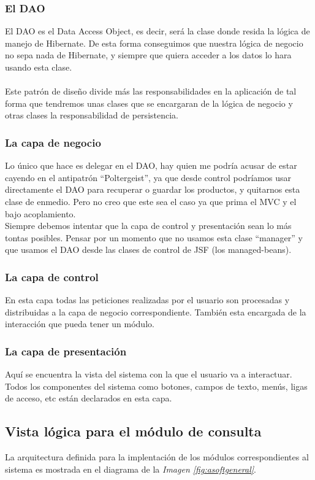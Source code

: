 \documentclass[../reportesINE.tex]{subfiles}
\begin{document}
\subsubsection{El DAO}
El DAO es el Data Access Object, es decir, será la clase donde resida la lógica de manejo de Hibernate. De esta forma conseguimos que nuestra lógica de negocio no sepa nada de Hibernate, y siempre que quiera acceder a los datos lo hara usando esta clase. \\ \\
Este patrón de diseño divide más las responsabilidades en la aplicación de tal forma que tendremos unas clases que se encargaran de la lógica de negocio y otras clases la responsabilidad de persistencia.

\subsubsection{La capa de negocio}
Lo único que hace es delegar en el DAO, hay quien me podría acusar de estar cayendo en el antipatrón “Poltergeist”, ya que desde control podríamos usar directamente el DAO para recuperar o guardar los productos, y quitarnos esta clase de enmedio. Pero no creo que este sea el caso ya que prima el MVC y el bajo acoplamiento. \\
Siempre debemos intentar que la capa de control y presentación sean lo más tontas posibles. Pensar por un momento que no usamos esta clase “manager” y que usamos el DAO desde las clases de control de JSF (los managed-beans). 

\subsubsection{La capa de control}
En esta capa todas las peticiones realizadas por el usuario son procesadas y distribuidas a la capa de negocio correspondiente. También esta encargada de la interacción que pueda tener un módulo. 

\subsubsection{La capa de presentación}
Aquí se encuentra la vista del sistema con la que el usuario va a interactuar. Todos los componentes del sistema como botones, campos de texto, menús, ligas de acceso, etc están declarados en esta capa.


\subsection{Vista lógica para el módulo de consulta}
La arquitectura definida para la implentación de los módulos correspondientes al sistema es mostrada en el diagrama de la \textit{Imagen \ref{fig:asoftgeneral}}.
\end{document}
